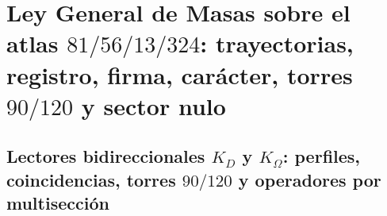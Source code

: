 \chapter{Ley General de Masas sobre el atlas \texorpdfstring{\(81/56/13/324\)}{81/56/13/324}: trayectorias, registro, firma, carácter, torres \texorpdfstring{\(90/120\)}{90/120} y sector nulo}
\label{chap:md-ley-general-masas-definitiva}
\begingroup
\renewcommand{\chapter}[2][]{}%

\endgroup

\begingroup
\let\HMTOwnerSection\section
\let\HMTOwnerSubsection\subsection
\let\HMTOwnerSubsubsection\subsubsection
\let\HMTOwnerParagraph\paragraph
\let\chapter\HMTOwnerSection
\let\section\HMTOwnerSubsection
\let\subsection\HMTOwnerSubsubsection
\let\subsubsection\HMTOwnerParagraph

\endgroup

\chapter{Lectores bidireccionales \texorpdfstring{\(K_D\)}{K D} y \texorpdfstring{\(K_\Omega\)}{K Omega}: perfiles, coincidencias, torres \texorpdfstring{\(90/120\)}{90/120} y operadores por multisección}
\label{chap:md-lectores-masicos-definitivo}
\begingroup
\renewcommand{\chapter}[2][]{}%

\endgroup


